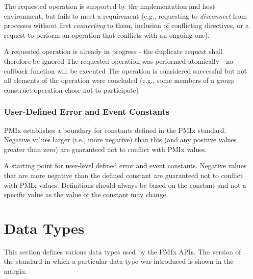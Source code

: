 \begin{constantdesc}
%
The requested operation is supported by the implementation and host environment, but fails to meet a requirement (e.g., requesting to \textit{disconnect} from processes without first \textit{connecting} to them, inclusion of conflicting directives, or a request to perform an operation that conflicts with an ongoing one).

%
A requested operation is already in progress - the duplicate request
shall therefore be ignored
%
The requested operation was performed atomically - no callback function will be executed
%
The operation is considered successful but not all elements of the operation were concluded (e.g., some members of a group construct operation chose not to participate)


\end{constantdesc}


\subsubsection{User-Defined Error and Event Constants}
\label{api:struct:usererrors}

\ac{PMIx} establishes a boundary for constants defined in the \ac{PMIx} standard. Negative values larger (i.e., more negative) than this (and any positive values greater than zero) are guaranteed not to conflict with \ac{PMIx} values.

\begin{constantdesc}
%
A starting point for user-level defined error and event constants.
Negative values that are more negative than the defined constant are guaranteed not to conflict with \ac{PMIx} values.
Definitions should always be based on the  constant and not a specific value as the value of the constant may change.
%
\end{constantdesc}



\section{Data Types}

This section defines various data types used by the PMIx APIs. The version of the standard in which a particular data type was introduced is shown in the margin.

